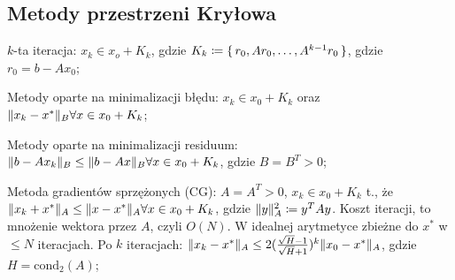 \subsection{Metody przestrzeni Kryłowa}

\entry
$k$-ta iteracja:
$x_k\in x_o+K_k$,
gdzie $K_k\coloneqq \set{r_0, Ar_0,\ldots, A^{k-1}r_0}$,
gdzie $r_0=b-Ax_0$;

\entry
Metody oparte na minimalizacji błędu:
$x_k\in x_0 +K_k$ oraz $\|x_k - x^*\|_B \forall x\in x_0 + K_k$;

\entry
Metody oparte na minimalizacji residuum:
$\|b-Ax_k\|_B \leq \|b-Ax\|_B \forall x\in x_0 +K_k$, gdzie $B=B^T>0$;

\entry
Metoda gradientów sprzężonych (CG):
$A=A^T>0$, $x_k\in x_0 + K_k$ t.,
że $\|x_k+x^*\|_A\leq \|x-x^*\|_A \forall x\in x_0 + K_k$,
gdzie $\|y\|^2_A \coloneqq y^TAy$.
Koszt iteracji, to mnożenie wektora przez $A$, czyli $O(N)$.
W idealnej arytmetyce zbieżne do $x^*$ w $\leq N$ iteracjach.
Po $k$ iteracjach:
$\|x_k - x^*\|_A\leq 2(\frac{\sqrt{H} - 1}{\sqrt{H} + 1})^k\|x_0-x^*\|_A$,
gdzie $H=\mathrm{cond}_2(A)$;

